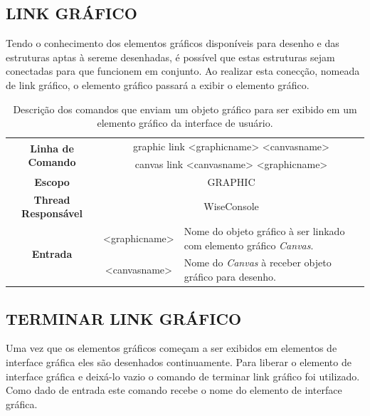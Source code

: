 \documentclass[a4paper,12pt]{monografia}
\theoremstyle{plain}
\theoremstyle{definition}
\theoremstyle{remark}
\begin{document}
\subsection{LINK GRÁFICO}\label{sec:graphic_link}

Tendo o conhecimento dos elementos gráficos disponíveis para desenho e das estruturas aptas à sereme desenhadas, é possível que estas estruturas sejam conectadas para que funcionem em conjunto. Ao realizar esta conecção, nomeada de link gráfico, o elemento gráfico passará a exibir o elemento gráfico.

\begin{center}
	\begin{table}[!htbp]
		\begin{tabular}{|c|c|m{}|}
			\hline
			\multirow{2}{*}{\textbf{Linha de Comando}} & \multicolumn{2}{c|}{graphic link <graphic\underline{\space\space}name> <canvas\underline{\space\space}name>} \\
			& \multicolumn{2}{c|}{canvas link <canvas\underline{\space\space}name> <graphic\underline{\space\space}name>} \\
			\hline
			\textbf{Escopo} & \multicolumn{2}{c|}{GRAPHIC} \\
			\hline
			\textbf{Thread Responsável} & \multicolumn{2}{c|}{WiseConsole} \\
			\hline
			\multirow{2}{*}{\textbf{Entrada}} &  <graphic\underline{\space\space}name> & Nome do objeto gráfico à ser linkado com elemento gráfico \textit{Canvas}. \\
			& <canvas\underline{\space\space}name> & Nome do \textit{Canvas} à receber objeto gráfico para desenho. \\
			\hline
		\end{tabular}
		\caption{Descrição dos comandos que enviam um objeto gráfico para ser exibido em um elemento gráfico da interface de usuário.}
		\label{tab:graphic_link}
	\end{table}
\end{center}

\subsection{TERMINAR LINK GRÁFICO}\label{sec:graphic_purge}

Uma vez que os elementos gráficos começam a ser exibidos em elementos de interface gráfica eles são desenhados continuamente. Para liberar o elemento de interface gráfica e deixá-lo vazio o comando de terminar link gráfico foi utilizado. Como dado de entrada este comando recebe o nome do elemento de interface gráfica.
\end{document}
